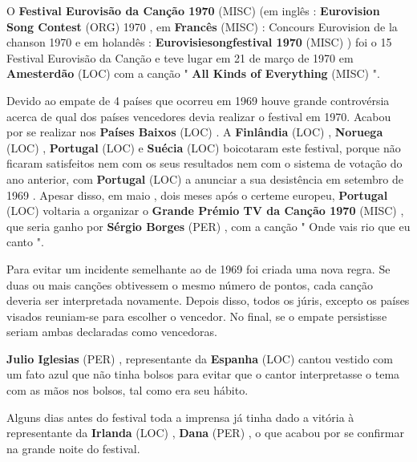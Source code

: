 \documentclass[12pt,a4paper]{article}
\begin{document}
O \textbf{Festival Eurovisão da Canção 1970} (MISC) (em inglês : \textbf{Eurovision Song Contest} (ORG) 1970 , em \textbf{Francês} (MISC) : Concours Eurovision de la chanson 1970 e em holandês : \textbf{Eurovisiesongfestival 1970} (MISC) ) foi o 15 Festival Eurovisão da Canção e teve lugar em 21 de março de 1970 em \textbf{Amesterdão} (LOC) com a canção " \textbf{All Kinds of Everything} (MISC) ".

Devido ao empate de 4 países que ocorreu em 1969 houve grande controvérsia acerca de qual dos países vencedores devia realizar o festival em 1970. Acabou por se realizar nos \textbf{Países Baixos} (LOC) . A \textbf{Finlândia} (LOC) , \textbf{Noruega} (LOC) , \textbf{Portugal} (LOC) e \textbf{Suécia} (LOC) boicotaram este festival, porque não ficaram satisfeitos nem com os seus resultados nem com o sistema de votação do ano anterior, com \textbf{Portugal} (LOC) a anunciar a sua desistência em setembro de 1969 . Apesar disso, em maio , dois meses após o certeme europeu, \textbf{Portugal} (LOC) voltaria a organizar o \textbf{Grande Prémio TV da Canção 1970} (MISC) , que seria ganho por \textbf{Sérgio Borges} (PER) , com a canção " Onde vais rio que eu canto ".

Para evitar um incidente semelhante ao de 1969 foi criada uma nova regra. Se duas ou mais canções obtivessem o mesmo número de pontos, cada canção deveria ser interpretada novamente. Depois disso, todos os júris, excepto os países visados reuniam-se para escolher o vencedor. No final, se o empate persistisse seriam ambas declaradas como vencedoras.

\textbf{Julio Iglesias} (PER) , representante da \textbf{Espanha} (LOC) cantou vestido com um fato azul que não tinha bolsos para evitar que o cantor interpretasse o tema com as mãos nos bolsos, tal como era seu hábito.

Alguns dias antes do festival toda a imprensa já tinha dado a vitória à representante da \textbf{Irlanda} (LOC) , \textbf{Dana} (PER) , o que acabou por se confirmar na grande noite do festival.
\end{document}
